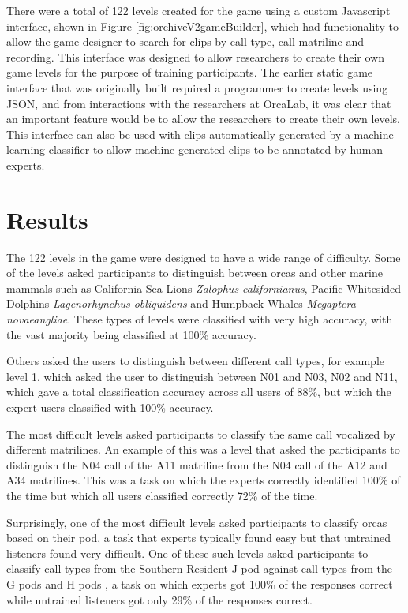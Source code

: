 \documentclass[12pt,oneside]{book}
\begin{document}
There were a total of 122 levels created for the game using a custom
Javascript interface, shown in Figure \ref{fig:orchiveV2gameBuilder},
which had functionality to allow the game designer to search for clips
by call type, call matriline and recording.  This interface was
designed to allow researchers to create their own game levels for the
purpose of training participants.  The earlier static game interface
that was originally built required a programmer to create levels using
JSON, and from interactions with the researchers at OrcaLab, it was
clear that an important feature would be to allow the researchers to
create their own levels.  This interface can also be used with clips
automatically generated by a machine learning classifier to allow
machine generated clips to be annotated by human experts.

\section{Results}

The 122 levels in the game were designed to have a wide range of
difficulty.  Some of the levels asked participants to distinguish
between orcas and other marine mammals such as California Sea Lions
\textit{Zalophus californianus}, Pacific Whitesided Dolphins
\textit{Lagenorhynchus obliquidens} and Humpback Whales
\textit{Megaptera novaeangliae}.  These types of levels were
classified with very high accuracy, with the vast majority being
classified at 100\% accuracy.

Others asked the users to distinguish between different call types,
for example level 1, which asked the user to distinguish between N01
and N03, N02 and N11, which gave a total classification accuracy
across all users of 88\%, but which the expert users classified with
100\% accuracy.

The most difficult levels asked participants to classify the same call
vocalized by different matrilines.  An example of this was a level
that asked the participants to distinguish the N04 call of the A11
matriline from the N04 call of the A12 and A34 matrilines.  This was a
task on which the experts correctly identified 100\% of the time but
which all users classified correctly 72\% of the time.

Surprisingly, one of the most difficult levels asked participants to
classify orcas based on their pod, a task that experts typically found
easy but that untrained listeners found very difficult.  One of these
such levels asked participants to classify call types from the
Southern Resident J pod against call types from the G pods and H pods
, a task on which experts got 100\% of the responses correct while
untrained listeners got only 29\% of the responses correct.
\end{document}
